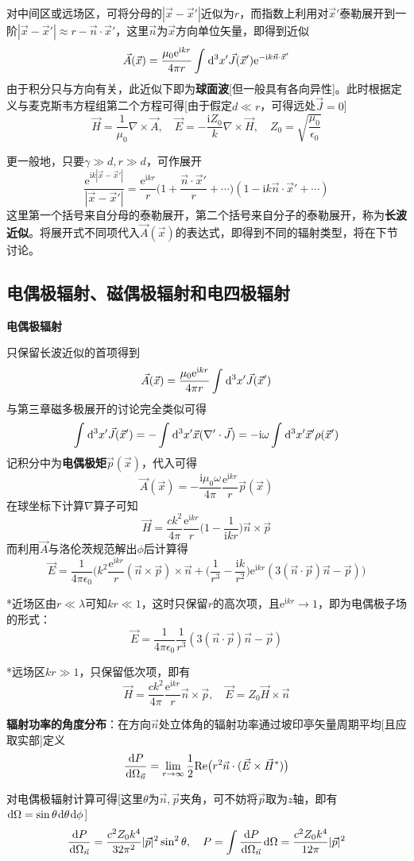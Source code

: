 \documentclass[a4paper,UTF8,fontset=windows]{ctexart}
\newcommand*{\dr}{\hspace{0.07em}\mathrm{d}}
\newcommand*{\er}{\mathrm{e}}
\newcommand*{\ir}{\mathrm{i}}
\newcommand*{\va}{\vec{A}}
\newcommand*{\ve}{\vec{E}}
\newcommand*{\vh}{\vec{H}}
\newcommand*{\vj}{\vec{J}}
\newcommand*{\vns}{\vec{n}}
\newcommand*{\vps}{\vec{p}}
\newcommand*{\vx}{\vec{x}}
\newcommand*{\dt}[2][t]{\frac{\dr #2}{\dr #1}}
\begin{document}
对中间区或远场区，可将分母的$|\vx-\vx'|$近似为$r$，而指数上利用对$\vx'$泰勒展开到一阶$|\vx-\vx'|\approx r-\vns\cdot\vx'$，这里$\vns$为$\vx$方向单位矢量，即得到近似
$$\va(\vx)=\frac{\mu_0\er^{\ir kr}}{4\pi r}\int\dr^3x'\vj(\vx')\er^{-\ir k\vns\cdot\vx'}$$
由于积分只与方向有关，此近似下即为\textbf{球面波}[但一般具有各向异性]。此时根据定义与麦克斯韦方程组第二个方程可得[由于假定$d\ll r$，可得远处$\vj=0$]
$$\vh=\frac{1}{\mu_0}\nabla\times\va,\quad\ve=-\frac{\ir Z_0}{k}\nabla\times\vh,\quad Z_0=\sqrt{\frac{\mu_0}{\epsilon_0}}$$

更一般地，只要$\gamma\gg d,r\gg d$，可作展开
$$\frac{\er^{\ir k|\vx-\vx'|}}{|\vx-\vx'|}=\frac{\er^{\ir kr}}{r}\bigg(1+\frac{\vns\cdot\vx'}{r}+\cdots\bigg)(1-\ir k\vns\cdot\vx'+\cdots)$$
这里第一个括号来自分母的泰勒展开，第二个括号来自分子的泰勒展开，称为\textbf{长波近似}。将展开式不同项代入$\va(\vx)$的表达式，即得到不同的辐射类型，将在下节讨论。

\subsection{电偶极辐射、磁偶极辐射和电四极辐射}
\textbf{电偶极辐射}

只保留长波近似的首项得到
$$\va(\vx)=\frac{\mu_0\er^{\ir kr}}{4\pi r}\int\dr^3x'\vj(\vx')$$
与第三章磁多极展开的讨论完全类似可得
$$\int\dr^3x'\vj(\vx')=-\int\dr^3x'\vx(\nabla'\cdot\vj)=-\ir\omega\int\dr^3x'\vx'\rho(\vx')$$
记积分中为\textbf{电偶极矩}$\vps(\vx)$，代入可得
$$\va(\vx)=-\frac{\ir\mu_0\omega}{4\pi}\frac{\er^{\ir kr}}{r}\vps(\vx)$$
在球坐标下计算$\nabla$算子可知
$$\vh=\frac{ck^2}{4\pi}\frac{\er^{\ir kr}}{r}\bigg(1-\frac{1}{\ir kr}\bigg)\vns\times\vps$$
而利用$\va$与洛伦茨规范解出$\phi$后计算得
$$\ve=\frac{1}{4\pi\epsilon_0}\bigg(k^2\frac{\er^{\ir kr}}{r}(\vns\times\vps)\times\vns+\bigg(\frac{1}{r^3}-\frac{\ir k}{r^2}\bigg)\er^{\ir kr}(3(\vns\cdot\vps)\vns-\vps)\bigg)$$

*近场区由$r\ll\lambda$可知$kr\ll1$，这时只保留$r$的高次项，且$\er^{\ir kr}\to1$，即为电偶极子场的形式：
$$\ve=\frac{1}{4\pi\epsilon_0}\frac{1}{r^3}(3(\vns\cdot\vps)\vns-\vps)$$

*远场区$kr\gg1$，只保留低次项，即有
$$\vh=\frac{ck^2}{4\pi}\frac{\er^{\ir kr}}{r}\vns\times\vps,\quad\ve=Z_0\vh\times\vns$$

\textbf{辐射功率的角度分布}：在方向$\vns$处立体角的辐射功率通过坡印亭矢量周期平均[且应取实部]定义
$$\frac{\dr P}{\dr\Omega_{\vns}}=\lim_{r\to\infty}\frac{1}{2}\mathrm{Re}\big(r^2\vns\cdot(\ve\times\vh^*)\big)$$

对电偶极辐射计算可得[这里$\theta$为$\vns,\vps$夹角，可不妨将$\vps$取为$z$轴，即有$\dr\Omega=\sin\theta\dr\theta\dr\phi$]
$$\dt[\Omega_{\vns}]{P}=\frac{c^2Z_0k^4}{32\pi^2}|\vps|^2\sin^2\theta,\quad P=\int\dt[\Omega_{\vns}]{P}\dr\Omega=\frac{c^2Z_0k^4}{12\pi}|\vps|^2$$
\end{document}
